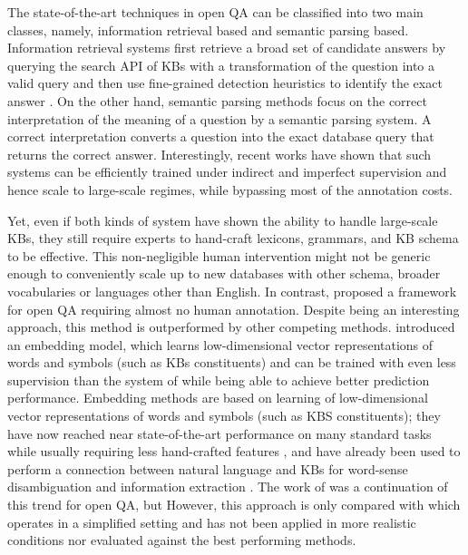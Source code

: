 \documentclass[runningheads,a4paper]{llncs}
\begin{document}
The state-of-the-art techniques in open QA can be classified 
into two main classes, namely, information retrieval based and 
semantic parsing based. 
Information retrieval systems first retrieve a broad set
of candidate answers by querying the search API of KBs with a
transformation of the question into a valid query and then use
fine-grained detection heuristics to identify the exact answer
\cite{kolomiyets2011survey,unger2012template,yao2014information}.
On the other hand, semantic parsing methods focus on the correct
interpretation of the meaning of a question by a semantic parsing
system. A correct interpretation converts a question
into the exact database query that returns the correct answer.
Interestingly, recent works
\cite{berant-EtAl:2013:EMNLP,kwiatkowski-EtAl:2013:EMNLP,berant2014semantic,fader2014open}
have shown that such systems can be efficiently trained under
indirect and imperfect supervision and hence scale to large-scale
regimes, while bypassing most of the annotation costs.

Yet, even if both kinds of system have shown the ability to handle
large-scale KBs, they still require experts to hand-craft lexicons,
grammars, and KB schema to be effective. 
This non-negligible human
intervention might not be generic enough to conveniently scale up to
new databases with other schema, broader vocabularies or 
languages other than English. In contrast, \cite{paralex} proposed a framework for open QA requiring
almost no human annotation.
Despite being an interesting approach, this method is outperformed by other
competing methods.
\cite{bordes2014open}  introduced an embedding model, which
learns low-dimensional vector representations of words and 
symbols
(such as KBs constituents) and can be trained
with even less supervision than the system of \cite{paralex} while
being able to achieve better prediction performance.
Embedding methods are based on learning of low-dimensional vector
representations of words and symbols (such as KBS constituents); they
have now reached near state-of-the-art performance on many standard
tasks while usually requiring less hand-crafted features
\cite{collobert:2011b,socher2013recursive}, and have already been used
to perform a connection between natural language and KBs for
word-sense disambiguation and information extraction
\cite{bordes:12aistats,weston-EtAl:2013:EMNLP}.
The work of \cite{bordes2014open} was a continuation of this trend for
open QA, but 
\fi
However, this approach is only compared with \cite{paralex} which
operates in a simplified setting and has not been applied in 
more realistic conditions nor evaluated against the best performing
methods.
\end{document}
